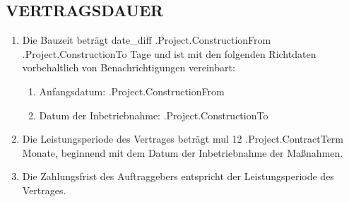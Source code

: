 \subsection{VERTRAGSDAUER}
\begin{enumerate}
	\item Die Bauzeit beträgt {{date_diff .Project.ConstructionFrom .Project.ConstructionTo}} Tage und ist mit den folgenden Richtdaten vorbehaltlich von Benachrichtigungen vereinbart:
	\begin{enumerate}
		\item Anfangsdatum:     	  \iffalse input project.construction_from value="{{.Project.ConstructionFrom}}" type="date" \fi {{.Project.ConstructionFrom}}
		\item Datum der Inbetriebnahme:   \iffalse input project.construction_to value="{{.Project.ConstructionTo}}" type="date" \fi {{.Project.ConstructionTo}}
	\end{enumerate}
	\item Die Leistungsperiode des Vertrages beträgt {{mul 12 .Project.ContractTerm}} Monate, beginnend mit dem Datum der Inbetriebnahme der Maßnahmen.
	\item Die Zahlungsfrist des Auftraggebers entspricht der Leistungsperiode des Vertrages.
\end{enumerate}

